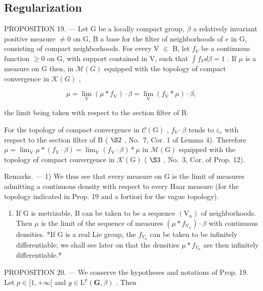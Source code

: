 \subsection{Regularization}

PROPOSITION 19. --- Let G be a locally compact group, \(\beta\) a relatively invariant positive measure \(\neq 0\) on G, B a base for the filter of neighborhoods of \(e\) in G, consisting of compact neighborhoods. For every V \(\in\) B, let \(f_{V}\) be a continuous function \(\geqslant 0\) on G, with support contained in V, such that \(\int f_{V} d\beta = 1\) . If \(\mu\) is a measure on G then, in \(\mathcal{M}(G)\) equipped with the topology of compact convergence in \(\mathcal{K}(G)\) ,

\[
\mu = \lim _ {\mathrm{V}} (\mu * f _ {\mathrm{V}}) \cdot \beta = \lim _ {\mathrm{V}} (f _ {\mathrm{V}} * \mu) \cdot \beta ,
\]

the limit being taken with respect to the section filter of B.

For the topology of compact convergence in \(\mathcal{C}(\mathrm{G})\) , \(f_{V} \cdot \beta\) tends to \(\varepsilon_{e}\) with respect to the section filter of B ( \(\S2\) , No.~7, Cor. 1 of Lemma 4). Therefore \(\mu = \lim_{\mathrm{V}} \mu * (f_{\mathrm{V}} \cdot \beta) = \lim_{\mathrm{V}} (f_{\mathrm{V}} \cdot \beta) * \mu\) in \(\mathcal{M}(\mathrm{G})\) equipped with the topology of compact convergence in \(\mathcal{K}(\mathrm{G})\) ( \(\S3\) , No.~3, Cor. of Prop. 12).

Remarks. --- 1) We thus see that every measure on G is the limit of measures admitting a continuous density with respect to every Haar measure (for the topology indicated in Prop. 19 and a fortiori for the vague topology).

\begin{enumerate}
\def\labelenumi{\arabic{enumi})}
\setcounter{enumi}{1}
\tightlist
\item
  If G is metrizable, B can be taken to be a sequence \((\mathrm{V}_{n})\) of neighborhoods. Then \(\mu\) is the limit of the sequence of measures \((\mu * f_{\mathrm{V}_{n}}) \cdot \beta\) with continuous densities. *If G is a real Lie group, the \(f_{V_{n}}\) can be taken to be infinitely differentiable; we shall see later on that the densities \(\mu * f_{V_{n}}\) are then infinitely differentiable.*
\end{enumerate}

PROPOSITION 20. --- We conserve the hypotheses and notations of Prop. 19. Let \(p \in [1, +\infty[\) and \(g \in \mathrm{L}^p(\mathbf{G}, \beta)\) . Then

